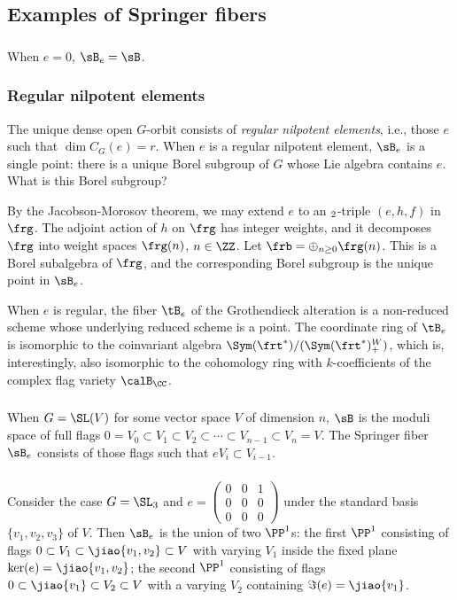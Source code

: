 \subsection{Examples of Springer fibers} 

\subsubsection{} When $e=0$, $\sB_{e}=\sB$.  

\subsubsection{Regular nilpotent elements}\label{sss:regular Spr} The unique dense open $G$-orbit consists of {\em regular nilpotent elements}, i.e., those $e$ such that $\dim C_{G}(e)=r$. When $e$ is a regular nilpotent element, $\sB_{e}$ is a single point: there is a unique Borel subgroup of $G$ whose Lie algebra contains $e$. What is this Borel subgroup? 

By the Jacobson-Morosov theorem, we may extend $e$ to an $\sl_{2}$-triple $(e,h,f)$ in $\frg$. The adjoint action of $h$ on $\frg$ has integer weights, and it decomposes $\frg$ into weight spaces $\frg(n)$, $n\in\ZZ$. Let $\frb=\oplus_{n\geq 0}\frg(n)$. This is a Borel subalgebra of $\frg$, and the corresponding Borel subgroup is the unique point in $\sB_{e}$.

When $e$ is regular,  the fiber $\tB_{e}$ of the Grothendieck alteration is a non-reduced scheme whose underlying reduced scheme is a point. The coordinate ring of $\tB_{e}$ is isomorphic to the coinvariant algebra $\Sym(\frt^{*})/(\Sym(\frt^{*})^{W}_{+})$, which is, interestingly, also isomorphic to the cohomology ring with $k$-coefficients of the complex flag variety $\calB_{\CC}$.

\subsubsection{} When $G=\SL(V)$ for some vector space $V$ of dimension $n$, $\sB$ is the moduli space of full flags $0=V_{0}\subset V_{1}\subset V_{2}\subset\cdots\subset V_{n-1}\subset V_{n}=V$. The Springer fiber $\sB_{e}$ consists of those flags such that $eV_{i}\subset V_{i-1}$.



\subsubsection{}\label{sss:SL3 subreg} Consider the case $G=\SL_{3}$ and $e=\left(\begin{array}{ccc} 0 & 0 & 1\\  0 & 0& 0 \\  0 & 0& 0 \end{array}\right)$ under the standard basis $\{v_{1}, v_{2}, v_{3}\}$ of $V$. Then $\sB_{e}$ is the union of two $\PP^{1}$s: the first $\PP^{1}$ consisting of flags $0\subset V_{1}\subset \jiao{v_{1}, v_{2}}\subset V$ with varying $V_{1}$ inside the fixed plane $\ker(e)=\jiao{v_{1},v_{2}}$; the second $\PP^{1}$ consisting of flags $0\subset \jiao{v_{1}}\subset V_{2}\subset V$ with a varying $V_{2}$ containing $\Im(e)=\jiao{v_{1}}$. 



